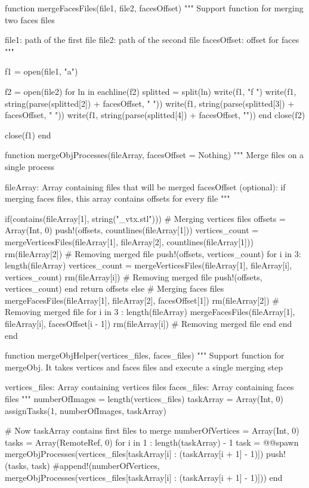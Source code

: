 \documentclass[11pt,oneside]{article}	%
\begin{document}
{function mergeFacesFiles(file1, file2, facesOffset)
  """
  Support function for merging two faces files

  file1: path of the first file
  file2: path of the second file
  facesOffset: offset for faces
  """

  f1 = open(file1, "a")

  f2 = open(file2)
  for ln in eachline(f2)
    splitted = split(ln)
    write(f1, "f ")
    write(f1, string(parse(splitted[2]) + facesOffset, " "))
    write(f1, string(parse(splitted[3]) + facesOffset, " "))
    write(f1, string(parse(splitted[4]) + facesOffset, "\n"))
  end
  close(f2)

  close(f1)
end

function mergeObjProcesses(fileArray, facesOffset = Nothing)
  """
  Merge files on a single process

  fileArray: Array containing files that will be merged
  facesOffset (optional): if merging faces files, this array contains
    offsets for every file
  """

  if(contains(fileArray[1], string("_vtx.stl")))
    # Merging vertices files
    offsets = Array(Int, 0)
    push!(offsets, countlines(fileArray[1]))
    vertices_count = mergeVerticesFiles(fileArray[1], fileArray[2], countlines(fileArray[1]))
    rm(fileArray[2]) # Removing merged file
    push!(offsets, vertices_count)
    for i in 3: length(fileArray)
      vertices_count = mergeVerticesFiles(fileArray[1], fileArray[i], vertices_count)
      rm(fileArray[i]) # Removing merged file
      push!(offsets, vertices_count)
    end
    return offsets
  else
    # Merging faces files
    mergeFacesFiles(fileArray[1], fileArray[2], facesOffset[1])
    rm(fileArray[2]) # Removing merged file
    for i in 3 : length(fileArray)
      mergeFacesFiles(fileArray[1], fileArray[i], facesOffset[i - 1])
      rm(fileArray[i]) # Removing merged file
    end
  end
end

function mergeObjHelper(vertices_files, faces_files)
  """
  Support function for mergeObj. It takes vertices and faces files
  and execute a single merging step

  vertices_files: Array containing vertices files
  faces_files: Array containing faces files
  """
  numberOfImages = length(vertices_files)
  taskArray = Array(Int, 0)
  assignTasks(1, numberOfImages, taskArray)

  # Now taskArray contains first files to merge
  numberOfVertices = Array(Int, 0)
  tasks = Array(RemoteRef, 0)
  for i in 1 : length(taskArray) - 1
    task = @@spawn mergeObjProcesses(vertices_files[taskArray[i] : (taskArray[i + 1] - 1)])
    push!(tasks, task)
    #append!(numberOfVertices, mergeObjProcesses(vertices_files[taskArray[i] : (taskArray[i + 1] - 1)]))
  end

}
\end{document}
